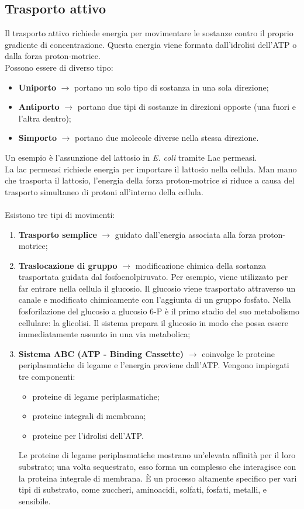 \subsection{Trasporto attivo}
Il trasporto attivo richiede energia per movimentare le sostanze contro il proprio gradiente di concentrazione. Questa energia viene formata dall'idrolisi dell'ATP o dalla forza proton-motrice. 
\\Possono essere di diverso tipo:
\begin{itemize}
    \item \textbf{Uniporto} $\xrightarrow{}$ portano un solo tipo di sostanza in una sola direzione; 
    \item \textbf{Antiporto} $\xrightarrow{}$ portano due tipi di sostanze in direzioni opposte (una fuori e l'altra dentro); 
    \item \textbf{Simporto} $\xrightarrow{}$ portano due molecole diverse nella stessa direzione.
\end{itemize}
Un esempio \`e l'assunzione del lattosio in \textit{E. coli} tramite Lac permeasi. 
\\La lac permeasi richiede energia per importare il lattosio nella cellula. Man mano che trasporta il lattosio, l'energia della forza proton-motrice si riduce a causa del trasporto simultaneo di protoni all'interno della cellula.
\\\\Esistono tre tipi di movimenti: 
\begin{enumerate}
    \item \textbf{Trasporto semplice} $\xrightarrow{}$ guidato dall'energia associata alla forza proton-motrice; 
    \item \textbf{Traslocazione di gruppo} $\xrightarrow{}$ modificazione chimica della sostanza trasportata guidata dal fosfoenolpiruvato. Per esempio, viene utilizzato per far entrare nella cellula il glucosio. Il glucosio viene trasportato attraverso un canale e modificato chimicamente con l'aggiunta di un gruppo fosfato. Nella fosforilazione del glucosio a glucosio 6-P \`e il primo stadio del suo metabolismo cellulare: la glicolisi. Il sistema prepara il glucosio in modo che possa essere immediatamente assunto in una via metabolica; 
    \item \textbf{Sistema ABC (ATP - Binding Cassette)} $\xrightarrow{}$ coinvolge le proteine periplasmatiche di legame e l'energia proviene dall'ATP. Vengono impiegati tre componenti:
    \begin{itemize}
        \item proteine di legame periplasmatiche; 
        \item proteine integrali di membrana; 
        \item proteine per l'idrolisi dell'ATP.
    \end{itemize}
    Le proteine di legame periplasmatiche mostrano un'elevata affinit\`a per il loro substrato; una volta sequestrato, esso forma un complesso che interagisce con la proteina integrale di membrana. \`E un processo altamente specifico per vari tipi di substrato, come zuccheri, aminoacidi, solfati, fosfati, metalli, e sensibile.
\end{enumerate}
